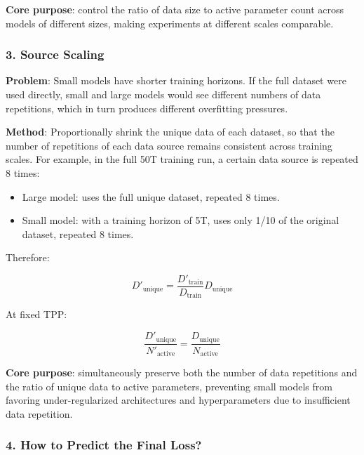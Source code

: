 \documentclass[
  english,
  11pt,
  a4paper,
]{article}
\providecommand{\tightlist}{%
  \setlength{\itemsep}{0pt}\setlength{\parskip}{0pt}}
\newenvironment{NotesFormula}{%
  \par\noindent\begin{minipage}{\linewidth}%
  \setlength{\parindent}{2em}%
  \setlength{\parskip}{0.35em}%
}{\end{minipage}\par}
\begin{document}
\textbf{Core purpose}: control the ratio of data size to active
parameter count across models of different sizes, making experiments at
different scales comparable.

\subsubsection{3. Source Scaling}\label{source-scaling}

\textbf{Problem}: Small models have shorter training horizons. If the
full dataset were used directly, small and large models would see
different numbers of data repetitions, which in turn produces different
overfitting pressures.

\textbf{Method}: Proportionally shrink the unique data of each dataset,
so that the number of repetitions of each data source remains consistent
across training scales. For example, in the full 50T training run, a
certain data source is repeated 8 times:

\begin{itemize}
\tightlist
\item
  Large model: uses the full unique dataset, repeated 8 times.
\item
  Small model: with a training horizon of 5T, uses only 1/10 of the
  original dataset, repeated 8 times.
\end{itemize}

\begin{NotesFormula}

Therefore:

\[D'_{\mathrm{unique}}=\frac{D'_{\mathrm{train}}}{D_{\mathrm{train}}}D_{\mathrm{unique}}\]

\end{NotesFormula}

\begin{NotesFormula}

At fixed TPP:

\[\boxed{\frac{D'_{\mathrm{unique}}}{N'_{\mathrm{active}}}=\frac{D_{\mathrm{unique}}}{N_{\mathrm{active}}}}\]

\end{NotesFormula}

\textbf{Core purpose}: simultaneously preserve both the number of data
repetitions and the ratio of unique data to active parameters,
preventing small models from favoring under-regularized architectures
and hyperparameters due to insufficient data repetition.

\subsubsection{4. How to Predict the Final
Loss?}\label{how-to-predict-the-final-loss}
\end{document}
